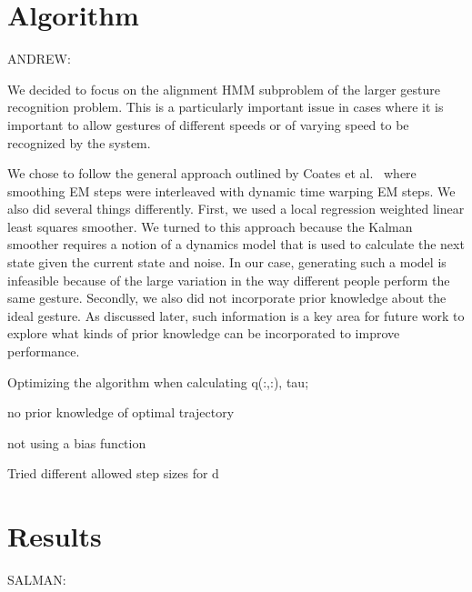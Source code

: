 \documentclass{article}
\begin{document}
\section{Algorithm}

ANDREW:

We decided to focus on the alignment HMM subproblem of the larger gesture
recognition problem. This is a particularly important issue in cases where it is
important to allow gestures of different speeds or of varying speed to be
recognized by the system.

We chose to follow the general approach outlined by Coates et al.\ 
\cite{Coates2008} where smoothing EM steps were interleaved with dynamic
time warping EM steps. We also did several things differently. First, we used
a local regression weighted linear least squares smoother. We turned to this
approach because the Kalman smoother requires a notion of a dynamics
model that is used to calculate the next state given the current state and noise.
In our case, generating such a model is infeasible because of the large
variation in the way different people perform the same gesture. Secondly, we
also did not incorporate prior knowledge about the ideal gesture. As discussed
later, such information is a key area for future work to explore what kinds of
prior knowledge can be incorporated to improve performance.

Optimizing the algorithm when calculating q(:,:), tau;

no prior knowledge of optimal trajectory

not using a bias function

Tried different allowed step sizes for d

\section{Results}

SALMAN:
\end{document}
